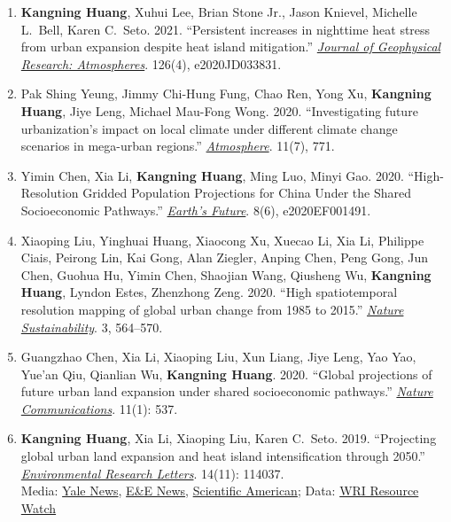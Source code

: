 \documentclass[11pt,letterpaper]{article}
\begin{document}
\begin{enumerate}
  \item \textbf{Kangning Huang}, Xuhui Lee, Brian Stone Jr., Jason Knievel, Michelle L.\ Bell, Karen C.\ Seto. 2021. ``Persistent increases in nighttime heat stress from urban expansion despite heat island mitigation.'' \href{https://agupubs.onlinelibrary.wiley.com/doi/10.1029/2020JD033831}{\textit{Journal of Geophysical Research: Atmospheres}}. 126(4), e2020JD033831.

  \item Pak Shing Yeung, Jimmy Chi-Hung Fung, Chao Ren, Yong Xu, \textbf{Kangning Huang}, Jiye Leng, Michael Mau-Fong Wong. 2020. ``Investigating future urbanization's impact on local climate under different climate change scenarios in mega-urban regions.'' \href{https://www.mdpi.com/2073-4433/11/7/771}{\textit{Atmosphere}}. 11(7), 771.

  \item Yimin Chen, Xia Li, \textbf{Kangning Huang}, Ming Luo, Minyi Gao. 2020. ``High-Resolution Gridded Population Projections for China Under the Shared Socioeconomic Pathways.'' \href{https://agupubs.onlinelibrary.wiley.com/doi/abs/10.1029/2020EF001491}{\textit{Earth's Future}}. 8(6), e2020EF001491.

  \item Xiaoping Liu, Yinghuai Huang, Xiaocong Xu, Xuecao Li, Xia Li, Philippe Ciais, Peirong Lin, Kai Gong, Alan Ziegler, Anping Chen, Peng Gong, Jun Chen, Guohua Hu, Yimin Chen, Shaojian Wang, Qiusheng Wu, \textbf{Kangning Huang}, Lyndon Estes, Zhenzhong Zeng. 2020. ``High spatiotemporal resolution mapping of global urban change from 1985 to 2015.'' \href{https://www.nature.com/articles/s41893-020-0521-x}{\textit{Nature Sustainability}}. 3, 564--570.

  \item Guangzhao Chen, Xia Li, Xiaoping Liu, Xun Liang, Jiye Leng, Yao Yao, Yue'an Qiu, Qianlian Wu, \textbf{Kangning Huang}. 2020. ``Global projections of future urban land expansion under shared socioeconomic pathways.'' \href{https://dx.doi.org/10.1038/s41467-020-14386-x}{\textit{Nature Communications}}. 11(1): 537.

  \item \textbf{Kangning Huang}, Xia Li, Xiaoping Liu, Karen C.\ Seto. 2019. ``Projecting global urban land expansion and heat island intensification through 2050.'' \href{https://iopscience.iop.org/article/10.1088/1748-9326/ab4b71}{\textit{Environmental Research Letters}}. 14(11): 114037.\\
  {\footnotesize Media: \href{https://environment.yale.edu/news/article/for-some-urban-areas-warming-climate-is-only-half-the-threat}{Yale News}, \href{https://www.eenews.net/stories/1061604545}{E\&E News}, \href{https://www.scientificamerican.com/article/urban-heat-islands-mean-warming-will-be-worse-in-cities/}{Scientific American}; Data: \href{https://bit.ly/39jW06Q}{WRI Resource Watch}}


\end{enumerate}
\end{document}
